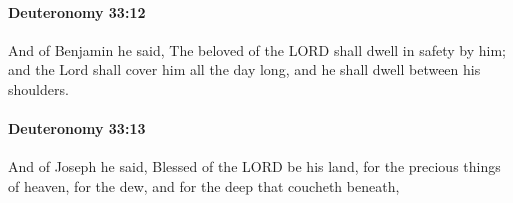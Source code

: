 		\paragraph{Deuteronomy 33:12} %
			\label{DEUTERONOMY-33-12}

			And of Benjamin he said, The beloved of the LORD shall dwell in safety by him; and the Lord shall cover him all the day long, and he shall dwell between his shoulders.


		\paragraph{Deuteronomy 33:13} %
			\label{DEUTERONOMY-33-13}

			And of Joseph he said, Blessed of the LORD be his land, for the precious things of heaven, for the dew, and for the deep that coucheth beneath,


